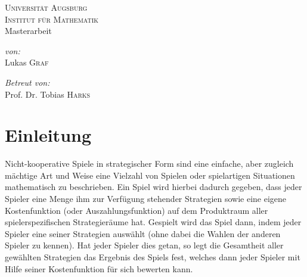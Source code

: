 \documentclass[a4paper,ngerman,11pt,bibliography=totoc]{scrartcl}
\theoremstyle{definition}
\theoremstyle{plain}
\theoremstyle{remark}
\begin{document}
	
	
	

\author{Lukas Graf}
\date{Letzte Aktualisierung: \today}

\thispagestyle{empty}


\begin{titlepage}\center
	\textsc{\LARGE Universität Augsburg}\\[1cm]
	
	\textsc{\Large Institut für Mathematik}\\[1.5cm]
	
	{\Large Masterarbeit \\[1cm]}
	{\huge {}}

	\vfill
	
	\begin{minipage}{0.4\textwidth}
		\begin{flushleft} \large
			\emph{von:}\\
			Lukas \textsc{Graf}
		\end{flushleft}
	\end{minipage}
	\begin{minipage}{0.4\textwidth}
		\begin{flushright} \large
			\emph{Betreut von:} \\
			Prof. Dr. Tobias \textsc{Harks}
		\end{flushright}
	\end{minipage}
	
\end{titlepage}


\tableofcontents

\listoftodos

\newpage
{}
{}
\section*{Einleitung}

Nicht-kooperative Spiele in strategischer Form sind eine einfache, aber zugleich mächtige Art und Weise eine Vielzahl von Spielen oder spielartigen Situationen mathematisch zu beschrieben. Ein Spiel wird hierbei dadurch gegeben, dass jeder Spieler eine Menge ihm zur Verfügung stehender Strategien sowie eine eigene Kostenfunktion (oder Auszahlungsfunktion) auf dem Produktraum aller spielerspezifischen Strategieräume hat. \glqq Gespielt\grqq{} wird das Spiel dann, indem jeder Spieler eine seiner Strategien auswählt (ohne dabei die Wahlen der anderen Spieler zu kennen). Hat jeder Spieler dies getan, so legt die Gesamtheit aller gewählten Strategien das Ergebnis des Spiels fest, welches dann jeder Spieler mit Hilfe seiner Kostenfunktion für sich bewerten kann.
\end{document}
